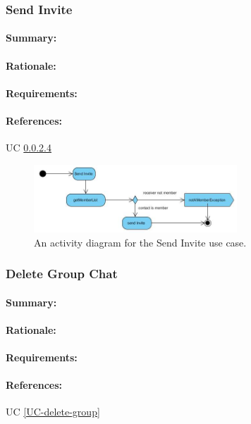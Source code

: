 \documentclass[11pt]{article}
\begin{document}
\subsubsection{Send Invite} \label{FR-invite}
\paragraph{Summary:}
\paragraph{Rationale:}
\paragraph{Requirements:}
\paragraph{References:} UC \ref{}
 \begin{figure}[H]
 \centering
 \includegraphics[width=3in]{./images/process-sendInvite.jpg}
 \caption[Send Invite Activity Diagram]{An activity diagram for the Send Invite use case.}
 \label{FR-figure-send-invite}
 \end{figure}
 
\subsubsection{Delete Group Chat} \label{FR-delete-group}
\paragraph{Summary:}
\paragraph{Rationale:}
\paragraph{Requirements:}
\paragraph{References:} UC \ref{UC-delete-group}
\end{document}
